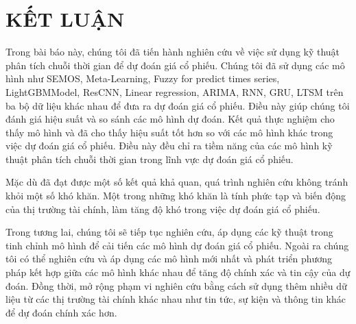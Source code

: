 \documentclass[conference]{IEEEtran}
\begin{document}
\section{KẾT LUẬN}
Trong bài báo này, chúng tôi đã tiến hành nghiên cứu về việc sử dụng kỹ thuật phân tích chuỗi thời gian để dự đoán giá cổ phiếu. Chúng tôi đã sử dụng các mô hình như SEMOS, Meta-Learning, Fuzzy for predict times series, LightGBMModel, ResCNN, Linear regression, ARIMA, RNN, GRU, LTSM trên ba bộ dữ liệu khác nhau để đưa ra dự đoán giá cổ phiếu. Điều này giúp chúng tôi đánh giá hiệu suất và so sánh các mô hình dự đoán. Kết quả thực nghiệm cho thấy mô hình  và  đã cho thấy hiệu suất tốt hơn so với các mô hình khác trong việc dự đoán giá cổ phiếu. Điều này đều chỉ ra tiềm năng của các mô hình kỹ thuật phân tích chuỗi thời gian trong lĩnh vực dự đoán giá cổ phiếu.

Mặc dù đã đạt được một số kết quả khả quan, quá trình nghiên cứu không tránh khỏi một số khó khăn. Một trong những khó khăn là tính phức tạp và biến động của thị trường tài chính, làm tăng độ khó trong việc dự đoán giá cổ phiếu. 

Trong tương lai, chúng tôi sẽ tiếp tục nghiên cứu, áp dụng các kỹ thuật trong tinh chỉnh mô hình để cải tiến các mô hình dự đoán giá cổ phiếu. Ngoài ra chúng tôi có thể nghiên cứu và áp dụng các mô hình mới nhất và phát triển phương pháp kết hợp giữa các mô hình khác nhau để tăng độ chính xác và tin cậy của dự đoán. Đồng thời, mở rộng phạm vi nghiên cứu bằng cách sử dụng thêm nhiều dữ liệu từ các thị trường tài chính khác nhau như tin tức, sự kiện và thông tin khác để dự đoán chính xác hơn.
\end{document}
